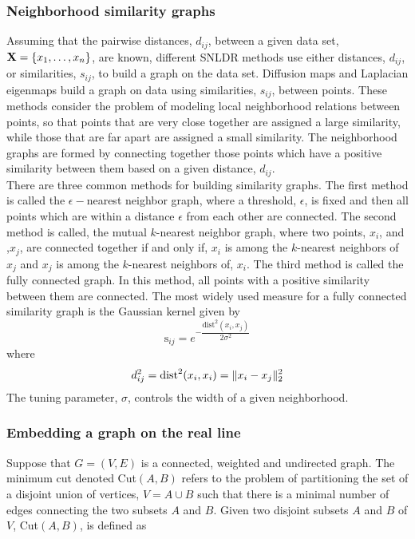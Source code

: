 \subsubsection{Neighborhood similarity graphs}
Assuming that the pairwise distances, $d_{ij}$, between a given data set, 
$ \textbf{X} = \{x_{1}, \ldots, x_{n}\}$, are known, different SNLDR methods
use either distances, $d_{ij}$, or similarities, $s_{ij}$, to build a graph 
on the data set. Diffusion maps and Laplacian eigenmaps build a graph on data using similarities, $s_{ij}$, between points.
These methods consider the problem of modeling local neighborhood relations
between points, so that points that are very close together are assigned a large similarity, while those that are far apart are assigned a small similarity.
The neighborhood graphs are formed by connecting together those points which have a positive similarity between them based on a given distance, $d_{ij}$.\\

There are three common methods for building similarity graphs.
The first method is called the $\epsilon-$nearest neighbor graph, where a threshold, $\epsilon$, is fixed and then  all points which are within a distance $\epsilon$ from each other are connected. The second method is called, the mutual $k$-nearest neighbor graph, where two points, $x_{i}$, and ,$x_{j}$, are connected together if and only if, $x_{i}$ is among the $k$-nearest neighbors of $x_{j}$ and $x_{j}$ is among the $k$-nearest neighbors of, $x_{i}$.
The third method is called the fully connected graph. In this method, all 
points with a positive similarity between them are connected.
The most widely used measure for a fully connected similarity graph is the Gaussian kernel given by 
\[
\text{s}_{ij} = e^{-\dfrac{\text{dist}^{2}(x_{i}, x_{j})}{2 \sigma^2 } } 
\]
where
\[
d_{ij}^{2} = \text{dist}^{2}(x_{i}, x_{i}) = \lVert x_{i}-x_{j}\rVert_{2}^{2}
\]
The tuning parameter, $\sigma$, controls the width of a given neighborhood.



\subsubsection{Embedding a graph on the real line}
Suppose that $G=(V,E)$ is a connected, weighted and undirected graph.
The minimum cut denoted Cut$(A,B)$ refers to the problem of partitioning the set of a disjoint union of vertices, $V = A  \displaystyle \cup B$  such that there is a minimal number of edges connecting the two subsets $A$ and $B$.
Given two disjoint subsets $A$ and $B$ of $V$, Cut$(A,B)$, is defined as

